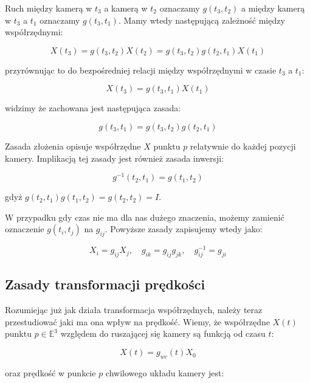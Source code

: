 \documentclass[a4paper,12pt]{article}
\newcommand{\E}{\mathbb{E}}
\begin{document}
Ruch między kamerą w $t_3$ a kamerą w $t_2$ oznaczamy $g(t_3,t_2)$ a między kamerą w $t_3$ a $t_1$ oznaczamy $g(t_3,t_1)$. Mamy wtedy następującą zależność między współrzędnymi:

\begin{equation}
X(t_3)=g(t_3,t_2)X(t_2)=g(t_3,t_2)g(t_2,t_1)X(t_1)
\end{equation}

\noindent przyrównując to do bezpośredniej relacji między współrzędnymi w czasie $t_3$ a $t_1$:

\begin{equation}
X(t_3)=g(t_3,t_1)X(t_1)
\end{equation}


\noindent widzimy że zachowana jest następująca zasada:

\begin{equation}
g(t_3,t_1) = g(t_3,t_2)g(t_2,t_1)
\end{equation}

Zasada złożenia opisuje współrzędne $X$ punktu $p$ relatywnie do każdej pozycji kamery. Implikacją tej zasady jest również zasada inwersji:

\begin{equation}
g^{-1}(t_2,t_1)=g(t_1,t_2)
\end{equation}

\noindent gdyż $g(t_2,t_1)g(t_1,t_2)=g(t_2,t_2)=I$.

W przypadku gdy czas nie ma dla nas dużego znaczenia, możemy zamienić oznaczenie $g(t_i,t_j)$ na $g_{ij}$. Powyższe zasady zapisujemy wtedy jako:

\begin{equation}
X_i=g_{ij}X_j, \quad g_{ik}=g_{ij}g_{jk}, \quad g^{-1}_{ij}=g_{ji}
\end{equation}

\subsection{Zasady transformacji prędkości}

Rozumiejąc już jak działa transformacja współrzędnych, należy teraz przestudiować jaki ma ona wpływ na prędkość. Wiemy, że współrzędne $X(t)$ punktu $p \in \E^3$ względem do ruszającej się kamery są funkcją od czasu $t$:

\begin{equation}
X(t)=g_{wc}(t)X_0
\end{equation}

oraz prędkość w punkcie $p$ chwilowego układu kamery jest:
\end{document}
